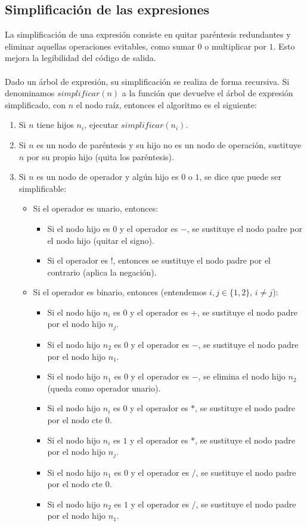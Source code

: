 \subsection*{Simplificación de las expresiones}
La simplificación de una expresión consiste en quitar paréntesis redundantes y eliminar aquellas operaciones evitables, como sumar $0$ o multiplicar por $1$. Esto mejora la legibilidad del código de salida.\\
\\Dado un árbol de expresión, su simplificación se realiza de forma recursiva. Si denominamos $simplificar(n)$ a la función que devuelve el árbol de expresión simplificado, con $n$ el nodo raíz, entonces el algoritmo es el siguiente:
\begin{enumerate}
	\item Si $n$ tiene hijos $n_i$, ejecutar $simplificar(n_i)$.
	\item Si $n$ es un nodo de paréntesis y su hijo no es un nodo de operación, sustituye $n$ por su propio hijo (quita los paréntesis).
	\item Si $n$ es un nodo de operador y algún hijo es $0$ o $1$, se dice que puede ser simplificable:
	\begin{itemize}
		\item Si el operador es unario, entonces:
		\begin{itemize}
			\item Si el nodo hijo es $0$ y el operador es $-$, se sustituye el nodo padre por el nodo hijo (quitar el signo).
			\item Si el operador es !, entonces se sustituye el nodo padre por el contrario (aplica la negación).
		\end{itemize}
		\item Si el operador es binario, entonces (entendemos $i,j \in \{1,2\}$, $i \neq j$):
		\begin{itemize}
			\item Si el nodo hijo $n_i$ es $0$ y el operador es $+$, se sustituye el nodo padre por el nodo hijo $n_j$.
			\item Si el nodo hijo $n_2$ es $0$ y el operador es $-$, se sustituye el nodo padre por el nodo hijo $n_1$.
			\item Si el nodo hijo $n_1$ es $0$ y el operador es $-$, se elimina el nodo hijo $n_2$ (queda como operador unario).
			\item Si el nodo hijo $n_i$ es $0$ y el operador es $*$, se sustituye el nodo padre por el nodo cte $0$.
			\item Si el nodo hijo $n_i$ es $1$ y el operador es $*$, se sustituye el nodo padre por el nodo hijo $n_j$.
			\item Si el nodo hijo $n_1$ es $0$ y el operador es $/$, se sustituye el nodo padre por el nodo cte $0$.
			\item Si el nodo hijo $n_2$ es $1$ y el operador es $/$, se sustituye el nodo padre por el nodo hijo $n_1$.
		\end{itemize}
	\end{itemize}
\end{enumerate}
